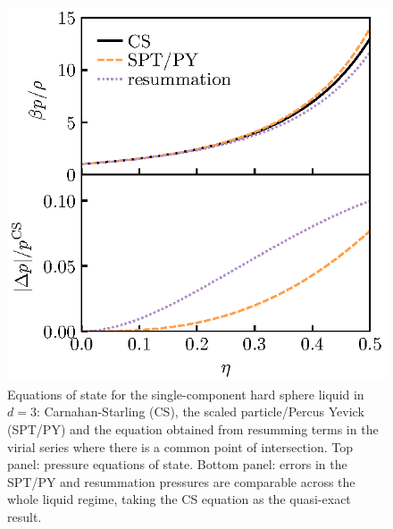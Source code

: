 \documentclass[11pt,twoside]{report}
\begin{document}
\begin{figure}
  \includegraphics[width=0.9\linewidth,outer]{resummation-pressure}
  \caption[Accuracy of the equation of state obtained from partially resumming the virial series]{
    Equations of state for the single-component hard sphere liquid in $d=3$: Carnahan-Starling (CS), the scaled particle/Percus Yevick (SPT/PY) and the equation obtained from resumming terms in the virial series where there is a common point of intersection.
    Top panel: pressure equations of state.
    Bottom panel: errors in the SPT/PY and resummation pressures are comparable across the whole liquid regime, taking the CS equation as the quasi-exact result.}
  \label{fig:resummation-pressure}
\end{figure}
\end{document}
